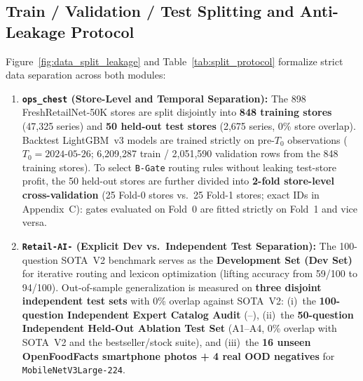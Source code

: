 \subsection*{Train / Validation / Test Splitting and Anti-Leakage Protocol}
Figure~\ref{fig:data_split_leakage} and Table~\ref{tab:split_protocol} formalize strict data separation across both modules:
\begin{enumerate}
    \item \textbf{\texttt{ops\_chest} (Store-Level and Temporal Separation):} The 898 FreshRetailNet-50K stores are split disjointly into \textbf{848 training stores} (47,325 series) and \textbf{50 held-out test stores} (2,675 series, 0\% store overlap). Backtest LightGBM~v3 models are trained strictly on pre-$T_0$ observations ($T_0 = \text{2024-05-26}$; 6,209,287 train / 2,051,590 validation rows from the 848 training stores). To select \texttt{B-Gate} routing rules without leaking test-store profit, the 50 held-out stores are further divided into \textbf{2-fold store-level cross-validation} (25 Fold-0 stores vs.\ 25 Fold-1 stores; exact IDs in Appendix~C): gates evaluated on Fold~0 are fitted strictly on Fold~1 and vice versa.
    \item \textbf{\texttt{Retail-AI-} (Explicit Dev vs.\ Independent Test Separation):} The 100-question SOTA~V2 benchmark serves as the \textbf{Development Set (Dev Set)} for iterative routing and lexicon optimization (lifting accuracy from 59/100 to 94/100). Out-of-sample generalization is measured on \textbf{three disjoint independent test sets} with 0\% overlap against SOTA~V2: (i)~the \textbf{100-question Independent Expert Catalog Audit} (--), (ii)~the \textbf{50-question Independent Held-Out Ablation Test Set} (A1--A4, 0\% overlap with SOTA~V2 and the bestseller/stock suite), and (iii)~the \textbf{16 unseen OpenFoodFacts smartphone photos + 4 real OOD negatives} for \texttt{MobileNetV3Large-224}.
\end{enumerate}

